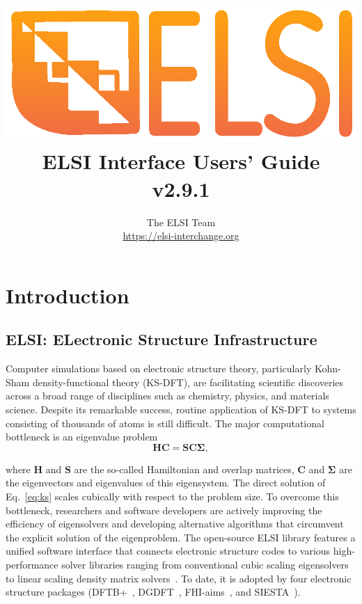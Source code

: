 \documentclass{report}
\begin{document}
\title{\includegraphics[scale=0.07]{elsi_logo.png}\\ \vspace{0.5cm} \textbf{ELSI Interface Users' Guide\\v2.9.1}}
\author{The ELSI Team\\ \url{https://elsi-interchange.org}}
\maketitle

\tableofcontents

\chapter{Introduction}
\section{ELSI: ELectronic Structure Infrastructure}
\label{sec:elsi}
Computer simulations based on electronic structure theory, particularly Kohn-Sham density-functional theory (KS-DFT), are facilitating scientific discoveries across a broad range of disciplines such as chemistry, physics, and materials science. Despite its remarkable success, routine application of KS-DFT to systems consisting of thousands of atoms is still difficult. The major computational bottleneck is an eigenvalue problem
\begin{equation}
\label{eq:ks}
\boldsymbol{H} \boldsymbol{C} = \boldsymbol{S} \boldsymbol{C} \boldsymbol{\Sigma},
\end{equation}

where $\boldsymbol{H}$ and $\boldsymbol{S}$ are the so-called Hamiltonian and overlap matrices, $\boldsymbol{C}$ and $\boldsymbol{\Sigma}$ are the eigenvectors and eigenvalues of this eigensystem. The direct solution of Eq.~\ref{eq:ks} scales cubically with respect to the problem size. To overcome this bottleneck, researchers and software developers are actively improving the efficiency of eigensolvers and developing alternative algorithms that circumvent the explicit solution of the eigenproblem. The open-source ELSI library features a unified software interface that connects electronic structure codes to various high-performance solver libraries ranging from conventional cubic scaling eigensolvers to linear scaling density matrix solvers~\cite{elsi_yu_2018}. To date, it is adopted by four electronic structure packages (DFTB+~\cite{dftb_aradi_2007}, DGDFT~\cite{dgdft_hu_2015}, FHI-aims~\cite{fhiaims_blum_2009}, and SIESTA~\cite{siesta_soler_2002}).
\end{document}
